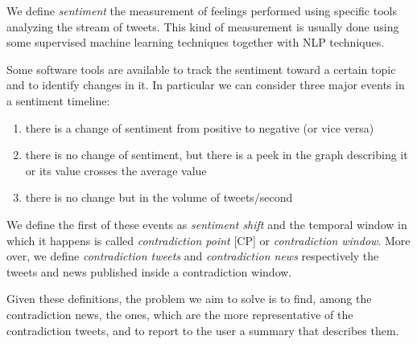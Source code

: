 We define \emph{sentiment} the measurement of feelings performed using specific tools analyzing the stream of tweets.
This kind of measurement is usually done using some supervised machine learning techniques together with NLP techniques.

Some software tools are available to track the sentiment toward a certain topic and to identify changes in it. In particular we can consider three major events in a sentiment timeline:

\begin{enumerate}
	\item there is a change of sentiment from positive to negative (or
		vice versa)
	\item there is no change of sentiment, but there is a peek in the graph
		describing it or its value crosses the average value
	\item there is no change but in the volume of tweets/second
\end{enumerate}

We define the first of these events as \emph{sentiment shift} and the temporal window in which it happens is called \emph{contradiction point} [CP] or \emph{contradiction window}. 
More over, we define \emph{contradiction tweets} and \emph{contradiction news} respectively the tweets and news published inside a contradiction window.

Given these definitions, the problem we aim to solve is to find, among the contradiction news, the ones, which are the more representative of the contradiction tweets, and to report to the user a summary that describes them.